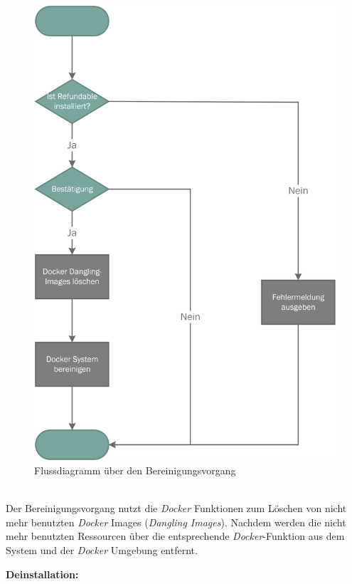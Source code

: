 \begin{figure}[H]
	\centering
	\includegraphics[width=0.55\linewidth]{images/mbeier_konzept/Clean}
	\caption[Flussdiagramm über den Bereinigungsvorgang]{Flussdiagramm über den Bereinigungsvorgang}
	\label{fig:clean}
\end{figure}
~\\
Der Bereinigungsvorgang nutzt die \textit{Docker} Funktionen zum Löschen von nicht mehr benutzten \textit{Docker} Images (\textit{Dangling Images}). Nachdem werden die nicht mehr benutzten Ressourcen über die entsprechende \textit{Docker}-Funktion aus dem System und der \textit{Docker} Umgebung entfernt.

\newpage

\textbf{Deinstallation:}

